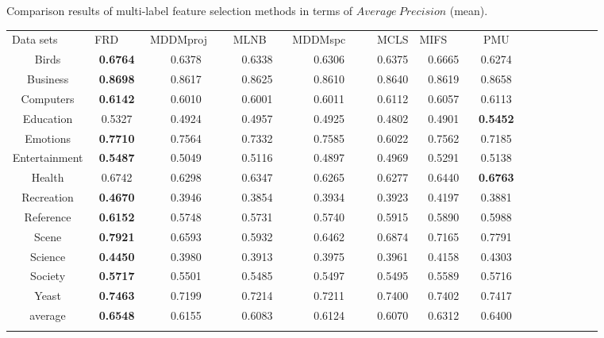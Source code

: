 \documentclass[final,3p,times]{elsarticle}
\begin{document}
\begin{table5-4*}
\begin{center}
\caption{Comparison results of multi-label feature selection methods in terms of $Average ~ Precision$ (mean).}
\label{tab:1}
\begin{tabular}{ccccccccccccccc}
\hline\noalign{\smallskip}
Data sets    ~~~~& FRD ~~~& MDDMproj ~~& MLNB  ~~& MDDMspc ~~~& MCLS & MIFS ~~~& PMU \\
\noalign{\smallskip}\hline\noalign{\smallskip}
Birds &	    \textbf{0.6764}   & 0.6378  &  0.6338  &  0.6306 &   0.6375  &  0.6665  &  0.6274    \\

Business &	    \textbf{0.8698}  &  0.8617  &  0.8625  &  0.8610  &  0.8640  &  0.8619  &  0.8658   \\

Computers &    \textbf{0.6142}  &  0.6010  &  0.6001  &  0.6011  &  0.6112  &  0.6057  &  0.6113     \\

Education &	   0.5327  &  0.4924  &  0.4957  &  0.4925  &  0.4802  &  0.4901  &  \textbf{0.5452}   \\

Emotions &	   \textbf{0.7710}  &  0.7564  &  0.7332  &  0.7585  &  0.6022  &  0.7562  &  0.7185    \\

Entertainment &    \textbf{0.5487}  &  0.5049 &   0.5116  &  0.4897  &  0.4969  &  0.5291 &   0.5138   \\

Health  &	   0.6742   & 0.6298  &  0.6347  &  0.6265  &  0.6277  &  0.6440 &   \textbf{0.6763}    \\

Recreation &	\textbf{0.4670}  &	 0.3946 &   0.3854 &   0.3934 &   0.3923   &    0.4197  &  0.3881  \\

Reference &	    \textbf{0.6152}  &  0.5748 &   0.5731 &   0.5740  &  0.5915  &  0.5890 &   0.5988   \\


 Scene &	   \textbf{0.7921}  &  0.6593  &  0.5932  &  0.6462  &  0.6874  &  0.7165  &  0.7791    \\

Science &     \textbf{0.4450}   & 0.3980   & 0.3913  &  0.3975  &  0.3961  &  0.4158  &  0.4303      \\

Society &	    \textbf{0.5717}  &  0.5501  &  0.5485  &  0.5497  &  0.5495 &   0.5589  &  0.5716    \\

 Yeast &	   \textbf{0.7463}  &  0.7199   & 0.7214  &  0.7211  &  0.7400  &  0.7402   & 0.7417    \\

average &     \textbf{0.6548}   & 0.6155   & 0.6083   & 0.6124  &  0.6070   & 0.6312  &  0.6400      \\
\noalign{\smallskip}\hline
\end{tabular}
\end{center}
\end{table5-4*}
\end{document}
